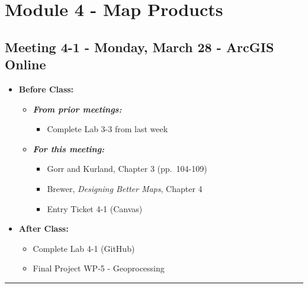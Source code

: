 \documentclass[
]{book}
\providecommand{\tightlist}{%
  \setlength{\itemsep}{0pt}\setlength{\parskip}{0pt}}
\begin{document}
\hypertarget{module-4---map-products}{%
\section*{Module 4 - Map Products}\label{module-4---map-products}}

\hypertarget{meeting-4-1---monday-march-28---arcgis-online}{%
\subsection*{Meeting 4-1 - Monday, March 28 - ArcGIS Online}\label{meeting-4-1---monday-march-28---arcgis-online}}

\begin{itemize}
\tightlist
\item
  \textbf{Before Class:}

  \begin{itemize}
  \tightlist
  \item
    \textbf{\emph{From prior meetings:}}

    \begin{itemize}
    \tightlist
    \item
      Complete Lab 3-3 from last week
    \end{itemize}
  \item
    \textbf{\emph{For this meeting:}}

    \begin{itemize}
    \tightlist
    \item
      Gorr and Kurland, Chapter 3 (pp.~104-109)
    \item
      Brewer, \emph{Designing Better Maps}, Chapter 4
    \item
      Entry Ticket 4-1 (Canvas)
    \end{itemize}
  \end{itemize}
\item
  \textbf{After Class:}

  \begin{itemize}
  \tightlist
  \item
    Complete Lab 4-1 (GitHub)
  \item
    Final Project WP-5 - Geoprocessing
  \end{itemize}
\end{itemize}

\begin{center}\rule{0.5\linewidth}{0.5pt}\end{center}
\end{document}
